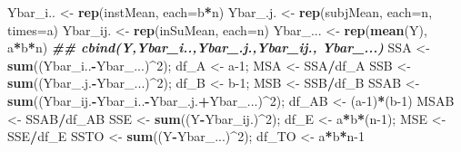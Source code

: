 \documentclass[
]{book}
\newenvironment{Shaded}{\begin{snugshade}}{\end{snugshade}}
\newcommand{\AttributeTok}[1]{\textcolor[rgb]{0.13,0.29,0.53}{#1}}
\newcommand{\DecValTok}[1]{\textcolor[rgb]{0.00,0.00,0.81}{#1}}
\newcommand{\DocumentationTok}[1]{\textcolor[rgb]{0.56,0.35,0.01}{\textbf{\textit{#1}}}}
\newcommand{\FunctionTok}[1]{\textcolor[rgb]{0.13,0.29,0.53}{\textbf{#1}}}
\newcommand{\NormalTok}[1]{#1}
\newcommand{\OtherTok}[1]{\textcolor[rgb]{0.56,0.35,0.01}{#1}}
\newcommand{\SpecialCharTok}[1]{\textcolor[rgb]{0.81,0.36,0.00}{\textbf{#1}}}
\begin{document}
\begin{Shaded}
\begin{Highlighting}[]
\NormalTok{Ybar\_i.. }\OtherTok{\textless{}{-}} \FunctionTok{rep}\NormalTok{(instMean, }\AttributeTok{each=}\NormalTok{b}\SpecialCharTok{*}\NormalTok{n)}
\NormalTok{Ybar\_.j. }\OtherTok{\textless{}{-}} \FunctionTok{rep}\NormalTok{(subjMean, }\AttributeTok{each=}\NormalTok{n, }\AttributeTok{times=}\NormalTok{a)}
\NormalTok{Ybar\_ij. }\OtherTok{\textless{}{-}} \FunctionTok{rep}\NormalTok{(inSuMean, }\AttributeTok{each=}\NormalTok{n)}
\NormalTok{Ybar\_... }\OtherTok{\textless{}{-}} \FunctionTok{rep}\NormalTok{(}\FunctionTok{mean}\NormalTok{(Y), a}\SpecialCharTok{*}\NormalTok{b}\SpecialCharTok{*}\NormalTok{n)}
\DocumentationTok{\#\# cbind(Y,Ybar\_i..,Ybar\_.j.,Ybar\_ij., Ybar\_...)}
\NormalTok{SSA }\OtherTok{\textless{}{-}} \FunctionTok{sum}\NormalTok{((Ybar\_i..}\SpecialCharTok{{-}}\NormalTok{Ybar\_...)}\SpecialCharTok{\^{}}\DecValTok{2}\NormalTok{); df\_A }\OtherTok{\textless{}{-}}\NormalTok{ a}\DecValTok{{-}1}\NormalTok{; MSA }\OtherTok{\textless{}{-}}\NormalTok{ SSA}\SpecialCharTok{/}\NormalTok{df\_A}
\NormalTok{SSB }\OtherTok{\textless{}{-}} \FunctionTok{sum}\NormalTok{((Ybar\_.j.}\SpecialCharTok{{-}}\NormalTok{Ybar\_...)}\SpecialCharTok{\^{}}\DecValTok{2}\NormalTok{); df\_B }\OtherTok{\textless{}{-}}\NormalTok{ b}\DecValTok{{-}1}\NormalTok{; MSB }\OtherTok{\textless{}{-}}\NormalTok{ SSB}\SpecialCharTok{/}\NormalTok{df\_B}
\NormalTok{SSAB }\OtherTok{\textless{}{-}} \FunctionTok{sum}\NormalTok{((Ybar\_ij.}\SpecialCharTok{{-}}\NormalTok{Ybar\_i..}\SpecialCharTok{{-}}\NormalTok{Ybar\_.j.}\SpecialCharTok{+}\NormalTok{Ybar\_...)}\SpecialCharTok{\^{}}\DecValTok{2}\NormalTok{); df\_AB }\OtherTok{\textless{}{-}}\NormalTok{ (a}\DecValTok{{-}1}\NormalTok{)}\SpecialCharTok{*}\NormalTok{(b}\DecValTok{{-}1}\NormalTok{)}
\NormalTok{MSAB }\OtherTok{\textless{}{-}}\NormalTok{ SSAB}\SpecialCharTok{/}\NormalTok{df\_AB}
\NormalTok{SSE }\OtherTok{\textless{}{-}} \FunctionTok{sum}\NormalTok{((Y}\SpecialCharTok{{-}}\NormalTok{Ybar\_ij.)}\SpecialCharTok{\^{}}\DecValTok{2}\NormalTok{);  df\_E }\OtherTok{\textless{}{-}}\NormalTok{ a}\SpecialCharTok{*}\NormalTok{b}\SpecialCharTok{*}\NormalTok{(n}\DecValTok{{-}1}\NormalTok{); MSE }\OtherTok{\textless{}{-}}\NormalTok{ SSE}\SpecialCharTok{/}\NormalTok{df\_E}
\NormalTok{SSTO }\OtherTok{\textless{}{-}} \FunctionTok{sum}\NormalTok{((Y}\SpecialCharTok{{-}}\NormalTok{Ybar\_...)}\SpecialCharTok{\^{}}\DecValTok{2}\NormalTok{); df\_TO }\OtherTok{\textless{}{-}}\NormalTok{ a}\SpecialCharTok{*}\NormalTok{b}\SpecialCharTok{*}\NormalTok{n}\DecValTok{{-}1}


\end{Highlighting}
\end{Shaded}
\end{document}
